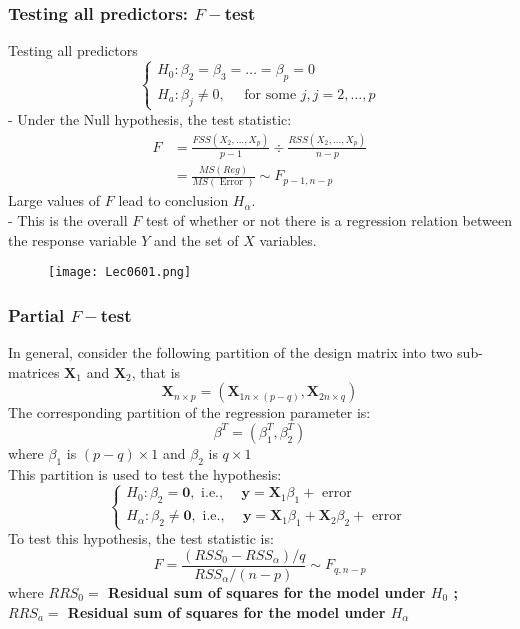 \documentclass[11pt,a4paper]{article}
\begin{document}
\subsubsection{Testing all predictors: $F-$test}
Testing all predictors
$$
\left\{\begin{array}{l}
H_{0}: \beta_{2}=\beta_{3}=\ldots=\beta_{p}=0 \\
H_{a}: \beta_{j} \neq 0, \quad \text { for some } j, j=2, \ldots, p
\end{array}\right.
$$
- Under the Null hypothesis, the test statistic:
$$
\begin{aligned}
F &=\frac{F S S\left(X_{2}, \ldots, X_{p}\right)}{p-1} \div \frac{R S S\left(X_{2}, \ldots, X_{p}\right)}{n-p} \\
&=\frac{M S(R e g)}{M S(\text { Error })} \sim F_{p-1, n-p}
\end{aligned}
$$
Large values of $F$ lead to conclusion $H_{\alpha}$.\\
- This is the overall $F$ test of whether or not there is a regression relation between the response variable $Y$ and the set of $X$ variables.
\begin{center}\begin{figure}[htbp]
    \centering
    \texttt{[image: Lec0601.png]}
    \caption{}
    \label{}
\end{figure}\end{center}
\subsubsection{Partial $F-$test}
In general, consider the following partition of the design matrix into two sub-matrices $\mathbf{X}_{1}$ and $\mathbf{X}_{2}$, that is
$$
\mathbf{X}_{n \times p}=\left(\mathbf{X}_{1 n \times(p-q)}, \mathbf{X}_{2 n \times q}\right)
$$
The corresponding partition of the regression parameter is:
$$
\beta^{T}=\left(\beta_{1}^{T}, \beta_{2}^{T}\right)
$$
where $\beta_{1}$ is $(p-q) \times 1$ and $\beta_{2}$ is $q \times 1$\\
This partition is used to test the hypothesis:
$$
\left\{\begin{array}{l}
H_{0}: \beta_{2}=\mathbf{0}, \text { i.e., } \quad \mathbf{y}=\mathbf{X}_{1} \beta_{1}+\text { error } \\
H_{\alpha}: \beta_{2} \neq \mathbf{0}, \text { i.e., }\quad \mathbf{y}=\mathbf{X}_{1} \beta_{1}+\mathbf{X}_{2} \beta_{2}+\text { error }
\end{array}\right.
$$
To test this hypothesis, the test statistic is:
$$
F=\frac{\left(R S S_{0}-R S S_{\alpha}\right) / q}{R S S_{\alpha} /(n-p)} \sim F_{q, n-p}
$$
where \textbf{$R R S_{0}=$ Residual sum of squares for the model under $H_{0}$ ; $R R S_{a}=$ Residual sum of squares for the model under $H_{\alpha}$}
\end{document}
